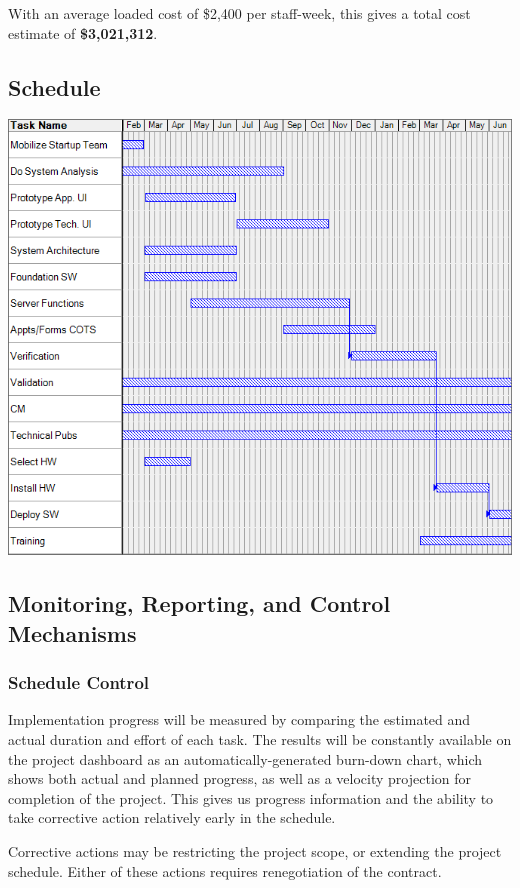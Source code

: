 \documentclass[11pt]{article}
\newcommand{\loadedcost}{\$2,400 per staff-week}
\begin{document}
With an average loaded cost of \loadedcost, this gives a total cost estimate of {\bf \$3,021,312}.


\subsection{Schedule}
\ifpdf
\includegraphics[width=\textwidth]{gantt.png}
\else
{}
\fi



\subsection{Monitoring, Reporting, and Control Mechanisms}

\subsubsection{Schedule Control}
Implementation progress will be measured by comparing the estimated and actual duration and effort
of each task.  The results will be constantly available on the project dashboard as an
automatically-generated burn-down chart, which shows both actual and planned progress, as well as a
velocity projection for completion of the project.  This gives us progress information and the
ability to take corrective action relatively early in the schedule.

Corrective actions may be restricting the project scope, or extending the project schedule.  Either
of these actions requires renegotiation of the contract.
\end{document}
